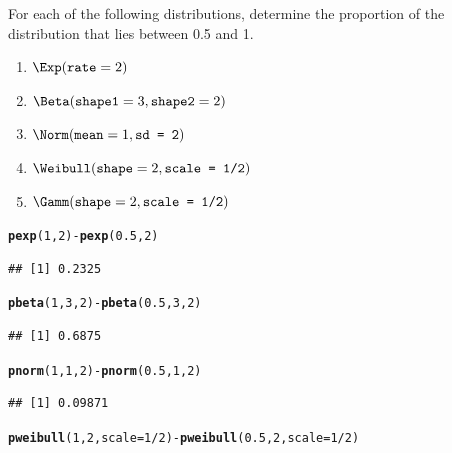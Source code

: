 \documentclass[twoside]{book}\usepackage[]{graphicx}\usepackage[]{xcolor}
\makeatletter
\newcommand{\hlnum}[1]{\textcolor[rgb]{0.686,0.059,0.569}{#1}}%
\newcommand{\hlopt}[1]{\textcolor[rgb]{0,0,0}{#1}}%
\newcommand{\hlstd}[1]{\textcolor[rgb]{0.345,0.345,0.345}{#1}}%
\newcommand{\hlkwc}[1]{\textcolor[rgb]{0.333,0.667,0.333}{#1}}%
\newcommand{\hlkwd}[1]{\textcolor[rgb]{0.737,0.353,0.396}{\textbf{#1}}}%
\newenvironment{kframe}{%
 \def\at@end@of@kframe{}%
 \ifinner\ifhmode%
  \def\at@end@of@kframe{\end{minipage}}%
  \begin{minipage}{\columnwidth}%
 \fi\fi%
 \def\FrameCommand##1{\hskip\@totalleftmargin \hskip-\fboxsep
 \colorbox{shadecolor}{##1}\hskip-\fboxsep
     \hskip-\linewidth \hskip-\@totalleftmargin \hskip\columnwidth}%
 \MakeFramed {\advance\hsize-\width
   \@totalleftmargin\z@ \linewidth\hsize
   \@setminipage}}%
 {\par\unskip\endMakeFramed%
 \at@end@of@kframe}
\newenvironment{knitrout}{}{} %
\makeatother
\begin{document}
\begin{problem}
	For each of the following distributions, determine the proportion 
	of the distribution that lies between 0.5 and 1.
	\begin{enumerate}
		\item
			$\Exp(\texttt{rate} = 2)$
		\item
			$\Beta(\texttt{shape1} = 3, \texttt{shape2} = 2)$
		\item
			$\Norm(\texttt{mean} = 1, \texttt{sd = 2})$
		\item
			$\Weibull(\texttt{shape} = 2, \texttt{scale = 1/2})$
		\item
			$\Gamm(\texttt{shape} = 2, \texttt{scale = 1/2})$
	\end{enumerate}
\end{problem}

\begin{solution}
\begin{knitrout}
\color{fgcolor}\begin{kframe}
\begin{alltt}
\hlkwd{pexp}\hlstd{(}\hlnum{1}\hlstd{,} \hlnum{2}\hlstd{)} \hlopt{-} \hlkwd{pexp}\hlstd{(}\hlnum{0.5}\hlstd{,} \hlnum{2}\hlstd{)}
\end{alltt}
\begin{verbatim}
## [1] 0.2325
\end{verbatim}
\begin{alltt}
\hlkwd{pbeta}\hlstd{(}\hlnum{1}\hlstd{,} \hlnum{3}\hlstd{,} \hlnum{2}\hlstd{)} \hlopt{-} \hlkwd{pbeta}\hlstd{(}\hlnum{0.5}\hlstd{,} \hlnum{3}\hlstd{,} \hlnum{2}\hlstd{)}
\end{alltt}
\begin{verbatim}
## [1] 0.6875
\end{verbatim}
\begin{alltt}
\hlkwd{pnorm}\hlstd{(}\hlnum{1}\hlstd{,} \hlnum{1}\hlstd{,} \hlnum{2}\hlstd{)} \hlopt{-} \hlkwd{pnorm}\hlstd{(}\hlnum{0.5}\hlstd{,} \hlnum{1}\hlstd{,} \hlnum{2}\hlstd{)}
\end{alltt}
\begin{verbatim}
## [1] 0.09871
\end{verbatim}
\begin{alltt}
\hlkwd{pweibull}\hlstd{(}\hlnum{1}\hlstd{,} \hlnum{2}\hlstd{,} \hlkwc{scale} \hlstd{=} \hlnum{1}\hlopt{/}\hlnum{2}\hlstd{)} \hlopt{-} \hlkwd{pweibull}\hlstd{(}\hlnum{0.5}\hlstd{,} \hlnum{2}\hlstd{,} \hlkwc{scale} \hlstd{=} \hlnum{1}\hlopt{/}\hlnum{2}\hlstd{)}
\end{alltt}

\end{kframe}
\end{knitrout}
\end{solution}
\end{document}
